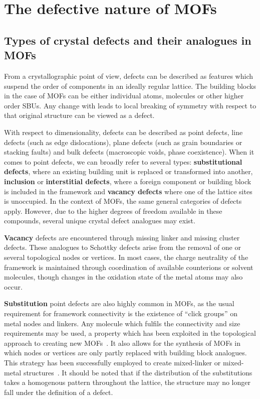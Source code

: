 
\section{The defective nature of MOFs}

\subsection{Types of crystal defects and their analogues in MOFs}

From a crystallographic point of view, defects can be described
as features which suspend the order of components in an ideally
regular lattice. The building blocks in the case of \glspl{MOF} can be either
individual atoms, molecules or other higher order \glspl{SBU}. 
Any change with leads to local breaking of symmetry with
respect to that original structure can be viewed as a defect.

With respect to dimensionality, defects can be described
as point defects, line defects (such as edge dislocations),
plane defects (such as grain boundaries or stacking faults) and bulk
defects (macroscopic voids, phase coexistence).
When it comes to point defects, we can broadly refer to several types:
\textbf{substitutional defects}, where an existing building unit is
replaced or transformed into another, \textbf{inclusion} or
\textbf{interstitial defects}, where a foreign component
or building block is included in the framework and \textbf{vacancy defects}
where one of the lattice sites is unoccupied.
In the context of \glspl{MOF}, the same general categories of defects
apply. However, due to the higher degrees of freedom available in
these compounds, several unique crystal defect analogues
may exist.

\textbf{Vacancy} defects are encountered through missing linker and
missing cluster defects. These analogues to Schottky defects
arise from the removal of one or several topological nodes or vertices.
In most cases, the charge neutrality of the framework
is maintained through coordination of available counterions or solvent
molecules, though changes in the oxidation state of the metal atoms
may also occur.

\textbf{Substitution} point defects are also highly common in \glspl{MOF}, as the
usual requirement for framework connectivity is the existence
of ``click groups'' on metal nodes and linkers. Any
molecule which fulfils the connectivity and size requirements may
be used, a property which has been exploited in the topological
approach to creating new 
\glspl{MOF}~\cite{burnettRecentAdvancesPorphyrinic2012,%
    liTopologicalAnalysisMetal2014,%
    stockSynthesisMetalOrganicFrameworks2012}.
It also allows for the synthesis of \glspl{MOF} in which nodes or vertices 
are only partly replaced with building block analogues. This strategy has
been successfully employed to create mixed-linker or mixed-metal 
structures~\cite{buekenTacklingDefectConundrum2017,%
	dhakshinamoorthyMixedmetalMixedlinkerMetal2016}.
It should be noted that if the distribution of the substitutions takes
a homogenous pattern throughout the lattice, the structure may no
longer fall under the definition of a defect.

